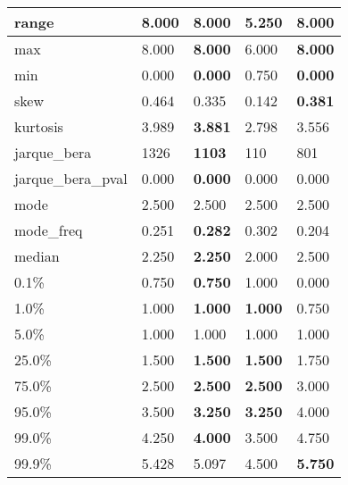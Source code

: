 \begin{table}[H]
\begin{tabular}{|l|m{10em}|m{10em}|m{10em}|m{10em}|}
\hline range & 8.000 & \bfseries 8.000 & \cellcolor[rgb]{0.9, 0.54, 0.52} 5.250 & \bfseries 8.000 \\
\hline max & 8.000 & \bfseries 8.000 & \cellcolor[rgb]{0.9, 0.54, 0.52} 6.000 & \bfseries 8.000 \\
\hline min & 0.000 & \bfseries 0.000 & \cellcolor[rgb]{0.9, 0.54, 0.52} 0.750 & \bfseries 0.000 \\
\hline skew & 0.464 & 0.335 & \cellcolor[rgb]{0.9, 0.54, 0.52} 0.142 & \bfseries 0.381 \\
\hline kurtosis & 3.989 & \bfseries 3.881 & \cellcolor[rgb]{0.9, 0.54, 0.52} 2.798 & 3.556 \\
\hline jarque\_bera & 1326 & \bfseries 1103 & \cellcolor[rgb]{0.9, 0.54, 0.52} 110 & 801 \\
\hline jarque\_bera\_pval & 0.000 & \bfseries 0.000 & \cellcolor[rgb]{0.9, 0.54, 0.52} 0.000 & 0.000 \\
\hline mode & 2.500 & 2.500 & 2.500 & 2.500 \\
\hline mode\_freq & 0.251 & \bfseries 0.282 & \cellcolor[rgb]{0.9, 0.54, 0.52} 0.302 & 0.204 \\
\hline median & 2.250 & \bfseries 2.250 & \cellcolor[rgb]{0.9, 0.54, 0.52} 2.000 & \cellcolor[rgb]{0.9, 0.54, 0.52} 2.500 \\
\hline 0.1\% & 0.750 & \bfseries 0.750 & 1.000 & \cellcolor[rgb]{0.9, 0.54, 0.52} 0.000 \\
\hline 1.0\% & 1.000 & \bfseries 1.000 & \bfseries 1.000 & \cellcolor[rgb]{0.9, 0.54, 0.52} 0.750 \\
\hline 5.0\% & 1.000 & 1.000 & 1.000 & 1.000 \\
\hline 25.0\% & 1.500 & \bfseries 1.500 & \bfseries 1.500 & \cellcolor[rgb]{0.9, 0.54, 0.52} 1.750 \\
\hline 75.0\% & 2.500 & \bfseries 2.500 & \bfseries 2.500 & \cellcolor[rgb]{0.9, 0.54, 0.52} 3.000 \\
\hline 95.0\% & 3.500 & \bfseries 3.250 & \bfseries 3.250 & \cellcolor[rgb]{0.9, 0.54, 0.52} 4.000 \\
\hline 99.0\% & 4.250 & \bfseries 4.000 & \cellcolor[rgb]{0.9, 0.54, 0.52} 3.500 & 4.750 \\
\hline 99.9\% & 5.428 & 5.097 & \cellcolor[rgb]{0.9, 0.54, 0.52} 4.500 & \bfseries 5.750 \\
\hline
\end{tabular}
\end{table}

